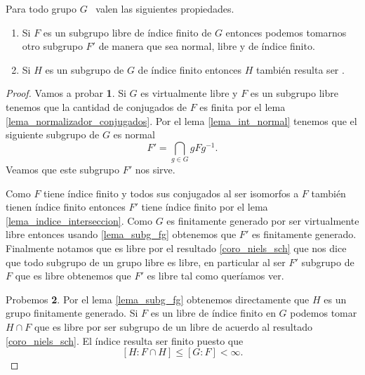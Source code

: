 \documentclass[tesis.tex]{subfiles}
\begin{document}
\begin{prop}\label{prop_vls}
	Para todo grupo $G$ \vl \ valen las siguientes propiedades.
	\begin{enumerate}
		\item Si $F$ es un subgrupo libre de índice finito de $G$ entonces podemos tomarnos otro subgrupo $F'$ de manera que sea normal, libre y de índice finito.
		\item Si $H$ es un subgrupo de $G$ de índice finito entonces $H$ también resulta ser \vl.
	\end{enumerate}
\end{prop}

\begin{proof}
	Vamos a probar \textbf{1}.
	Si $G$ es virtualmente libre y $F$ es un subgrupo libre tenemos que la cantidad de conjugados de $F$ es finita por el lema \ref{lema_normalizador_conjugados}.
	Por el lema \ref{lema_int_normal} tenemos que el siguiente subgrupo de $G$ es normal
	\[
	F' = \bigcap_{g \in G} gFg^{-1}.
	\]
	Veamos que este subgrupo $F'$ nos sirve. 
	
	
	Como $F$ tiene índice finito y todos sus conjugados al ser isomorfos a $F$ también tienen índice finito entonces $F'$ tiene índice finito por el lema \ref{lema_indice_interseccion}.
	Como $G$ es finitamente generado por ser virtualmente libre entonces usando \ref{lema_subg_fg} obtenemos que $F'$ es finitamente generado.
	Finalmente notamos que es libre por el resultado \ref{coro_niels_sch} que nos dice que todo subgrupo de un grupo libre es libre, en particular al ser $F'$ subgrupo de $F$ que es libre obtenemos que $F'$ es libre tal como queríamos ver.
	
	Probemos \textbf{2}. 
	Por el lema \ref{lema_subg_fg} obtenemos directamente que $H$ es un grupo finitamente generado.
	Si $F$ es un libre de índice finito en $G$ podemos tomar $H \cap F$ que es libre por ser subgrupo de un libre de acuerdo al resultado \ref{coro_niels_sch}.
	El índice resulta ser finito puesto que 
	\[
	[H:F\cap H] \le [G:F] < \infty.
	\]
\end{proof}
\end{document}
